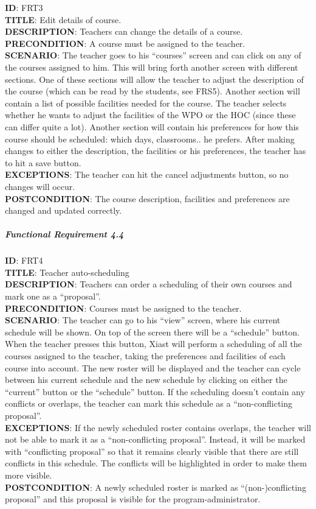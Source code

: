 \documentclass[9pt]{article}
\begin{document}
\textbf{ID}: FRT3\\\textbf{TITLE}: Edit details of
course.\\\textbf{DESCRIPTION}: Teachers can change the details of a
course.\\\textbf{PRECONDITION}: A course must be assigned to the
teacher.\\\textbf{SCENARIO}: The teacher goes to his ``courses'' screen
and can click on any of the courses assigned to him. This will bring
forth another screen with different sections. One of these sections will
allow the teacher to adjust the description of the course (which can be
read by the students, see FRS5). Another section will contain a list of
possible facilities needed for the course. The teacher selects whether
he wants to adjust the facilities of the WPO or the HOC (since these can
differ quite a lot). Another section will contain his preferences for
how this course should be scheduled: which days, classrooms.. he
prefers. After making changes to either the description, the facilities
or his preferences, the teacher has to hit a save
button.\\\textbf{EXCEPTIONS}: The teacher can hit the cancel adjustments
button, so no changes will occur.\\\textbf{POSTCONDITION}: The course
description, facilities and preferences are changed and updated
correctly.

\subparagraph{Functional Requirement
4.4}\label{functional-requirement-4.4}

\textbf{ID}: FRT4\\\textbf{TITLE}: Teacher
auto-scheduling\\\textbf{DESCRIPTION}: Teachers can order a scheduling
of their own courses and mark one as a
``proposal''.\\\textbf{PRECONDITION}: Courses must be assigned to the
teacher.\\\textbf{SCENARIO}: The teacher can go to his ``view'' screen,
where his current schedule will be shown. On top of the screen there
will be a ``schedule'' button. When the teacher presses this button,
Xiast will perform a scheduling of all the courses assigned to the
teacher, taking the preferences and facilities of each course into
account. The new roster will be displayed and the teacher can cycle
between his current schedule and the new schedule by clicking on either
the ``current'' button or the ``schedule'' button. If the scheduling
doesn't contain any conflicts or overlaps, the teacher can mark this
schedule as a ``non-conflicting proposal''.\\\textbf{EXCEPTIONS}: If the
newly scheduled roster contains overlaps, the teacher will not be able
to mark it as a ``non-conflicting proposal''. Instead, it will be marked
with ``conflicting proposal'' so that it remains clearly visible that
there are still conflicts in this schedule. The conflicts will be
highlighted in order to make them more visible.\\\textbf{POSTCONDITION}:
A newly scheduled roster is marked as ``(non-)conflicting proposal'' and
this proposal is visible for the program-administrator.
\end{document}
